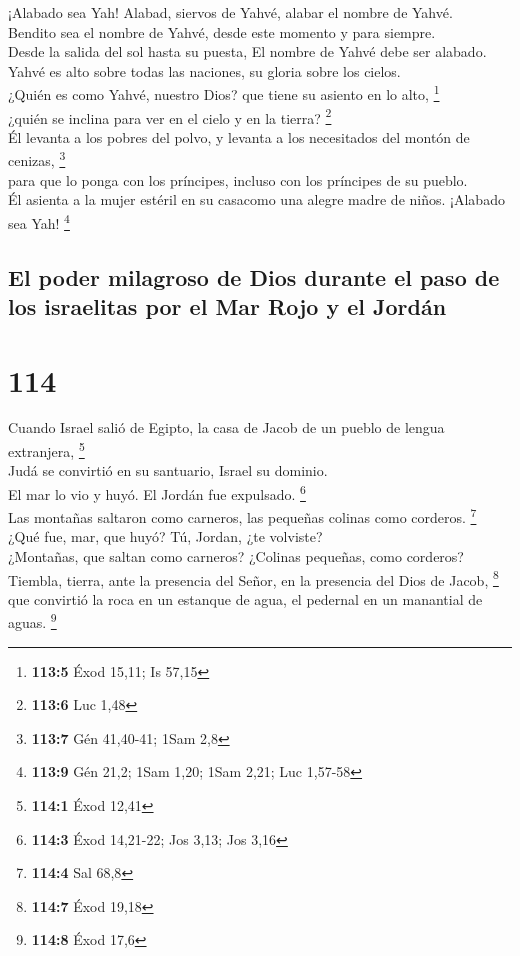  ¡Alabado sea Yah! Alabad, siervos de Yahvé, alabar el
nombre de Yahvé.\\
 Bendito sea el nombre de Yahvé, desde este momento y para
siempre.\\
 Desde la salida del sol hasta su puesta, El nombre de
Yahvé debe ser alabado.\\
 Yahvé es alto sobre todas las naciones, su gloria sobre
los cielos.\\
 ¿Quién es como Yahvé, nuestro Dios? que tiene su asiento
en lo alto, \footnote{\textbf{113:5} Éxod 15,11; Is 57,15}\\
 ¿quién se inclina para ver en el cielo y en la tierra?
\footnote{\textbf{113:6} Luc 1,48}\\
 Él levanta a los pobres del polvo, y levanta a los
necesitados del montón de cenizas, \footnote{\textbf{113:7} Gén
  41,40-41; 1Sam 2,8}\\
 para que lo ponga con los príncipes, incluso con los
príncipes de su pueblo.\\
 Él asienta a la mujer estéril en su casacomo una alegre
madre de niños. ¡Alabado sea Yah! \footnote{\textbf{113:9} Gén 21,2;
  1Sam 1,20; 1Sam 2,21; Luc 1,57-58}

\hypertarget{el-poder-milagroso-de-dios-durante-el-paso-de-los-israelitas-por-el-mar-rojo-y-el-jorduxe1n}{%
\subsection{El poder milagroso de Dios durante el paso de los israelitas
por el Mar Rojo y el
Jordán}\label{el-poder-milagroso-de-dios-durante-el-paso-de-los-israelitas-por-el-mar-rojo-y-el-jorduxe1n}}

\hypertarget{section-111}{%
\section{114}\label{section-111}}

 Cuando Israel salió de Egipto, la casa de Jacob de un
pueblo de lengua extranjera, \footnote{\textbf{114:1} Éxod 12,41}\\
 Judá se convirtió en su santuario, Israel su dominio.\\
 El mar lo vio y huyó. El Jordán fue expulsado.
\footnote{\textbf{114:3} Éxod 14,21-22; Jos 3,13; Jos 3,16}\\
 Las montañas saltaron como carneros, las pequeñas colinas
como corderos. \footnote{\textbf{114:4} Sal 68,8}\\
 ¿Qué fue, mar, que huyó? Tú, Jordan, ¿te volviste?\\
 ¿Montañas, que saltan como carneros? ¿Colinas pequeñas,
como corderos?\\
 Tiembla, tierra, ante la presencia del Señor, en la
presencia del Dios de Jacob, \footnote{\textbf{114:7} Éxod 19,18}\\
 que convirtió la roca en un estanque de agua, el pedernal
en un manantial de aguas. \footnote{\textbf{114:8} Éxod 17,6}

